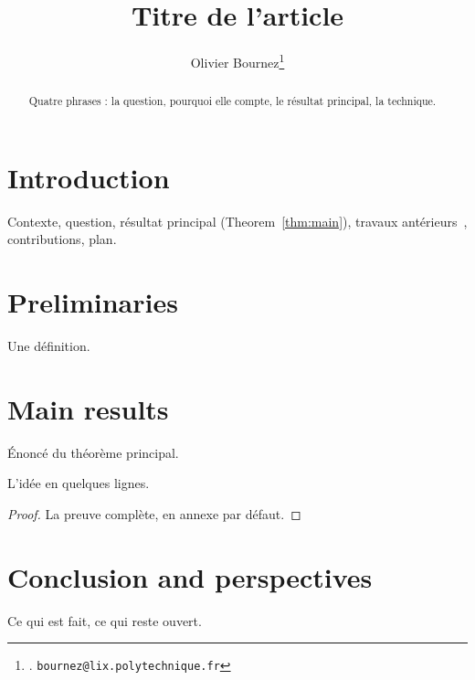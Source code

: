 \documentclass[a4paper,11pt]{article}
\title{Titre de l'article}
\author{Olivier Bournez\thanks{\affiliationofficielleolivier. \texttt{bournez@lix.polytechnique.fr}}}
\date{}
\begin{document}
\maketitle

\begin{abstract}
Quatre phrases : la question, pourquoi elle compte, le résultat principal, la technique.
\end{abstract}

\section{Introduction}
\label{sec:intro}

Contexte, question, résultat principal (Theorem~\ref{thm:main}), travaux
antérieurs~\cite{JournalACM2017}, contributions, plan.

\section{Preliminaries}
\label{sec:prelim}

\begin{definition}[Notion]
\label{def:notion}
Une définition.
\end{definition}

\section{Main results}
\label{sec:results}

\begin{theoremrep}
\label{thm:main}
Énoncé du théorème principal.
\end{theoremrep}
\begin{proofsketch}
L'idée en quelques lignes.
\end{proofsketch}
\begin{proof}
La preuve complète, en annexe par défaut.
\end{proof}

\section{Conclusion and perspectives}
\label{sec:conclusion}

Ce qui est fait, ce qui reste ouvert.



\end{document}
